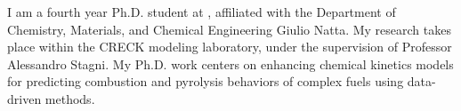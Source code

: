 I am a fourth year Ph.D. student at \polimi, affiliated with the Department of Chemistry,
Materials, and Chemical Engineering Giulio Natta. My research takes place within the
CRECK modeling laboratory, under the supervision of Professor Alessandro Stagni. My Ph.D.
work centers on enhancing chemical kinetics models for predicting combustion and
pyrolysis behaviors of complex fuels using data-driven methods.
%
%
%
